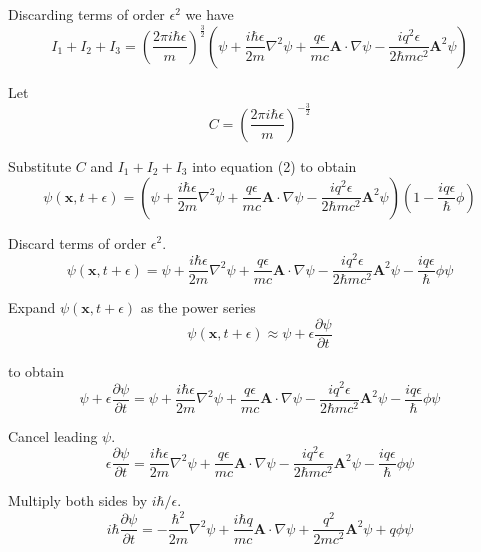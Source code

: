 Discarding terms of order $\epsilon^2$ we have
\begin{equation*}
I_1+I_2+I_3=\left(\frac{2\pi i\hbar\epsilon}{m}\right)^\frac{3}{2}
\left(
\psi
+\frac{i\hbar\epsilon}{2m}\nabla^2\psi
+\frac{q\epsilon}{mc}\mathbf A\cdot\nabla\psi
-\frac{iq^2\epsilon}{2\hbar mc^2}\mathbf A^2\psi
\right)
\end{equation*}

Let
\begin{equation*}
C=\left(\frac{2\pi i\hbar\epsilon}{m}\right)^{-\frac{3}{2}}
\end{equation*}

Substitute $C$ and $I_1+I_2+I_3$ into equation (2) to obtain
\begin{equation*}
\psi(\mathbf x,t+\epsilon)
=\left(\psi
+\frac{i\hbar\epsilon}{2m}\nabla^2\psi
+\frac{q\epsilon}{mc}\mathbf A\cdot\nabla\psi
-\frac{iq^2\epsilon}{2\hbar mc^2}\mathbf A^2\psi
\right)
\left(1-\frac{iq\epsilon}{\hbar}\phi\right)
\end{equation*}

Discard terms of order $\epsilon^2$.
\begin{equation*}
\psi(\mathbf x,t+\epsilon)
=\psi
+\frac{i\hbar\epsilon}{2m}\nabla^2\psi
+\frac{q\epsilon}{mc}\mathbf A\cdot\nabla\psi
-\frac{iq^2\epsilon}{2\hbar mc^2}\mathbf A^2\psi
-\frac{iq\epsilon}{\hbar}\phi\psi
\end{equation*}

Expand $\psi(\mathbf x,t+\epsilon)$ as the power series
\begin{equation*}
\psi(\mathbf x,t+\epsilon)\approx\psi+\epsilon\frac{\partial\psi}{\partial t}
\end{equation*}

to obtain
\begin{equation*}
\psi+\epsilon\frac{\partial\psi}{\partial t}
=\psi
+\frac{i\hbar\epsilon}{2m}\nabla^2\psi
+\frac{q\epsilon}{mc}\mathbf A\cdot\nabla\psi
-\frac{iq^2\epsilon}{2\hbar mc^2}\mathbf A^2\psi
-\frac{iq\epsilon}{\hbar}\phi\psi
\end{equation*}

Cancel leading $\psi$.
\begin{equation*}
\epsilon\frac{\partial\psi}{\partial t}
=\frac{i\hbar\epsilon}{2m}\nabla^2\psi
+\frac{q\epsilon}{mc}\mathbf A\cdot\nabla\psi
-\frac{iq^2\epsilon}{2\hbar mc^2}\mathbf A^2\psi
-\frac{iq\epsilon}{\hbar}\phi\psi
\end{equation*}

Multiply both sides by $i\hbar/\epsilon$.
\begin{equation*}
i\hbar\frac{\partial\psi}{\partial t}
=-\frac{\hbar^2}{2m}\nabla^2\psi
+\frac{i\hbar q}{mc}\mathbf A\cdot\nabla\psi
+\frac{q^2}{2mc^2}\mathbf A^2\psi
+q\phi\psi
\end{equation*}

